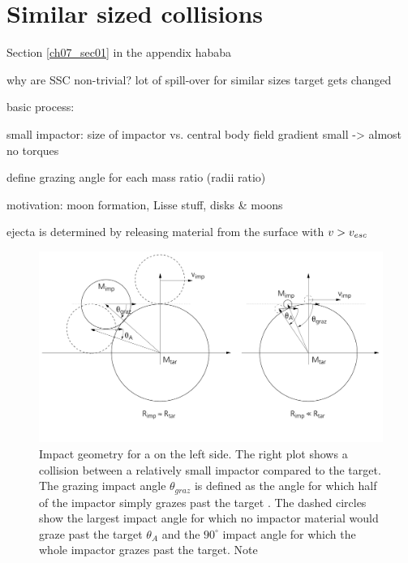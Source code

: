\newpage
\chapter{Similar sized collisions}
\graphicspath{{./03figs/}}

Section \ref{ch07_sec01} in the appendix hababa

why are SSC non-trivial?
lot of spill-over for similar sizes
target gets changed

basic process: 

small impactor: size of impactor vs. central body field gradient small -> almost no torques

define grazing angle for each mass ratio (radii ratio)

motivation: moon formation, Lisse stuff, disks \& moons

ejecta is determined by releasing material from the surface with $v > v_{esc}$







\begin{figure}[htbp]
\begin{center}
\includegraphics[scale=0.4]{03_grazing}
\caption{Impact geometry for a \SSC on the left side. The right plot shows a collision between a relatively small impactor compared to the target. The grazing impact angle $\theta_{graz}$ is defined as the angle for which half of the impactor simply grazes past the target \citep{Asphaug:2010p3539}. The dashed circles show the largest impact angle for which no impactor material would graze past the target $\theta_A$ and the $90^\circ$ impact angle for which the whole impactor grazes past the target. Note }
\label{ch03_fig01}
\end{center}
\end{figure}

